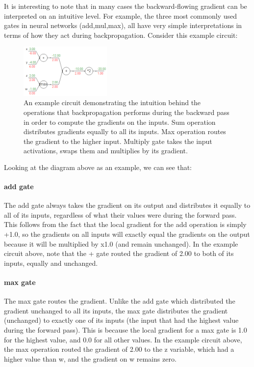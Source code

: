It is interesting to note that in many cases the backward-flowing gradient can be interpreted on an intuitive level. For example, the three most commonly used gates in neural networks (add,mul,max), all have very simple interpretations in terms of how they act during backpropagation. Consider this example circuit:

\begin{figure}[h]
  \centering
  \includegraphics[width=0.4\textwidth]{Images/backprop/4.png}
  \caption{An example circuit demonstrating the intuition behind the operations that backpropagation performs during the backward pass in order to compute the gradients on the inputs. Sum operation distributes gradients equally to all its inputs. Max operation routes the gradient to the higher input. Multiply gate takes the input activations, swaps them and multiplies by its gradient.
}
\end{figure}

Looking at the diagram above as an example, we can see that:

\paragraph*{add gate} The add gate always takes the gradient on its output and distributes it equally to all of its inputs, regardless of what their values were during the forward pass. This follows from the fact that the local gradient for the add operation is simply +1.0, so the gradients on all inputs will exactly equal the gradients on the output because it will be multiplied by x1.0 (and remain unchanged). In the example circuit above, note that the + gate routed the gradient of 2.00 to both of its inputs, equally and unchanged.

\paragraph*{max gate} The max gate routes the gradient. Unlike the add gate which distributed the gradient unchanged to all its inputs, the max gate distributes the gradient (unchanged) to exactly one of its inputs (the input that had the highest value during the forward pass). This is because the local gradient for a max gate is 1.0 for the highest value, and 0.0 for all other values. In the example circuit above, the max operation routed the gradient of 2.00 to the z variable, which had a higher value than w, and the gradient on w remains zero.


